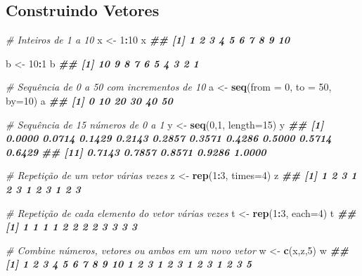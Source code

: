 \documentclass[
]{book}
\newenvironment{Shaded}{\begin{snugshade}}{\end{snugshade}}
\newcommand{\AttributeTok}[1]{\textcolor[rgb]{0.13,0.29,0.53}{#1}}
\newcommand{\CommentTok}[1]{\textcolor[rgb]{0.56,0.35,0.01}{\textit{#1}}}
\newcommand{\DecValTok}[1]{\textcolor[rgb]{0.00,0.00,0.81}{#1}}
\newcommand{\DocumentationTok}[1]{\textcolor[rgb]{0.56,0.35,0.01}{\textbf{\textit{#1}}}}
\newcommand{\FunctionTok}[1]{\textcolor[rgb]{0.13,0.29,0.53}{\textbf{#1}}}
\newcommand{\NormalTok}[1]{#1}
\newcommand{\OtherTok}[1]{\textcolor[rgb]{0.56,0.35,0.01}{#1}}
\newcommand{\SpecialCharTok}[1]{\textcolor[rgb]{0.81,0.36,0.00}{\textbf{#1}}}
\begin{document}
\subsection{Construindo Vetores}\label{construindo-vetores}

\begin{Shaded}
\begin{Highlighting}[]
\CommentTok{\# Inteiros de 1 a 10}
\NormalTok{x }\OtherTok{\textless{}{-}} \DecValTok{1}\SpecialCharTok{:}\DecValTok{10}
\NormalTok{x}
\DocumentationTok{\#\#  [1]  1  2  3  4  5  6  7  8  9 10}

\NormalTok{b }\OtherTok{\textless{}{-}} \DecValTok{10}\SpecialCharTok{:}\DecValTok{1}
\NormalTok{b}
\DocumentationTok{\#\#  [1]  10  9  8  7  6  5  4  3  2 1}

\CommentTok{\# Sequência de 0 a 50 com incrementos de 10}
\NormalTok{a }\OtherTok{\textless{}{-}} \FunctionTok{seq}\NormalTok{(}\AttributeTok{from =} \DecValTok{0}\NormalTok{, }\AttributeTok{to =} \DecValTok{50}\NormalTok{, }\AttributeTok{by=}\DecValTok{10}\NormalTok{)}
\NormalTok{a}
\DocumentationTok{\#\# [1]  0 10 20 30 40 50}

\CommentTok{\# Sequência de 15 números de 0 a 1}
\NormalTok{y }\OtherTok{\textless{}{-}} \FunctionTok{seq}\NormalTok{(}\DecValTok{0}\NormalTok{,}\DecValTok{1}\NormalTok{, }\AttributeTok{length=}\DecValTok{15}\NormalTok{)}
\NormalTok{y}
\DocumentationTok{\#\#  [1] 0.0000 0.0714 0.1429 0.2143 0.2857 0.3571 0.4286 0.5000 0.5714 0.6429}
\DocumentationTok{\#\# [11] 0.7143 0.7857 0.8571 0.9286 1.0000}

\CommentTok{\# Repetição de um vetor várias vezes}
\NormalTok{z }\OtherTok{\textless{}{-}} \FunctionTok{rep}\NormalTok{(}\DecValTok{1}\SpecialCharTok{:}\DecValTok{3}\NormalTok{, }\AttributeTok{times=}\DecValTok{4}\NormalTok{)}
\NormalTok{z}
\DocumentationTok{\#\#  [1] 1 2 3 1 2 3 1 2 3 1 2 3}

\CommentTok{\# Repetição de cada elemento do vetor várias vezes}
\NormalTok{t }\OtherTok{\textless{}{-}} \FunctionTok{rep}\NormalTok{(}\DecValTok{1}\SpecialCharTok{:}\DecValTok{3}\NormalTok{, }\AttributeTok{each=}\DecValTok{4}\NormalTok{)}
\NormalTok{t}
\DocumentationTok{\#\#  [1] 1 1 1 1 2 2 2 2 3 3 3 3}

\CommentTok{\# Combine números, vetores ou ambos em um novo vetor}
\NormalTok{w }\OtherTok{\textless{}{-}} \FunctionTok{c}\NormalTok{(x,z,}\DecValTok{5}\NormalTok{)}
\NormalTok{w}
\DocumentationTok{\#\#  [1]  1  2  3  4  5  6  7  8  9 10  1  2  3  1  2  3  1  2  3  1  2  3  5}
\end{Highlighting}
\end{Shaded}
\end{document}
